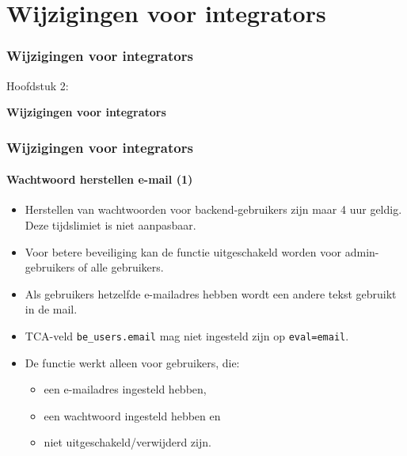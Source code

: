 %

\section{Wijzigingen voor integrators}
\begin{frame}[fragile]
	\frametitle{Wijzigingen voor integrators}

	\begin{center}\huge{Hoofdstuk 2:}\end{center}
	\begin{center}\huge{\color{typo3darkgrey}\textbf{Wijzigingen voor integrators}}\end{center}

\end{frame}


\begin{frame}[fragile]
	\frametitle{Wijzigingen voor integrators}
	\framesubtitle{Wachtwoord herstellen e-mail (1)}

	\begin{itemize}

		\item Herstellen van wachtwoorden voor backend-gebruikers zijn maar 4 uur geldig.\newline
			Deze tijdslimiet is niet aanpasbaar.
		\item Voor betere beveiliging kan de functie uitgeschakeld worden voor admin-gebruikers of alle gebruikers.
		\item Als gebruikers hetzelfde e-mailadres hebben wordt een andere tekst gebruikt in de mail.
		\item TCA-veld \texttt{be\_users.email} mag niet ingesteld zijn op \texttt{eval=email}.

		\item De functie werkt alleen voor gebruikers, die:
			\begin{itemize}
				\item een e-mailadres ingesteld hebben,
				\item een wachtwoord ingesteld hebben en
				\item niet uitgeschakeld/verwijderd zijn.
			\end{itemize}

	\end{itemize}

\end{frame}

